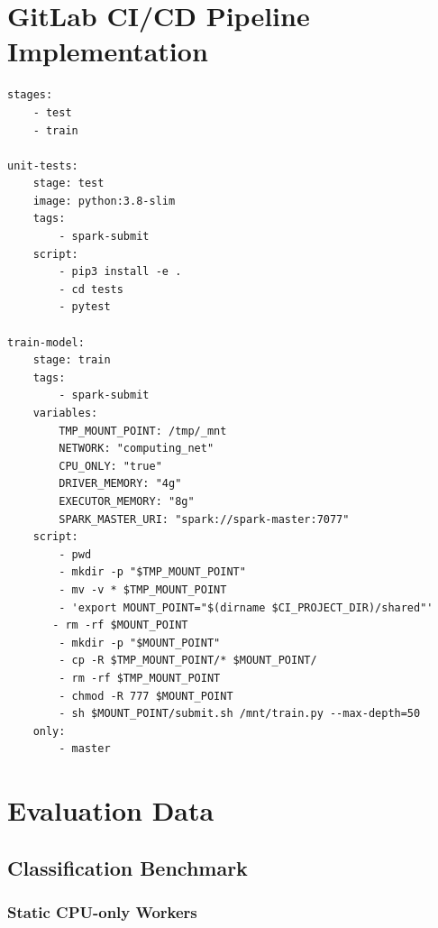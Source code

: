 \section{GitLab CI/CD Pipeline Implementation}

\begin{lstlisting}[label=lst:appendix_ci-pipeline_job, caption=texttt{.gitlab-ci.yml} configuration file]
stages:
    - test
    - train
 
unit-tests:
    stage: test
    image: python:3.8-slim
    tags:
        - spark-submit
    script:
        - pip3 install -e .
        - cd tests
        - pytest
 
train-model:
    stage: train
    tags:
        - spark-submit
    variables:
        TMP_MOUNT_POINT: /tmp/_mnt
        NETWORK: "computing_net"
        CPU_ONLY: "true"
        DRIVER_MEMORY: "4g"
        EXECUTOR_MEMORY: "8g"
        SPARK_MASTER_URI: "spark://spark-master:7077"
    script:
        - pwd
        - mkdir -p "$TMP_MOUNT_POINT"
        - mv -v * $TMP_MOUNT_POINT
        - 'export MOUNT_POINT="$(dirname $CI_PROJECT_DIR)/shared"'
       - rm -rf $MOUNT_POINT
        - mkdir -p "$MOUNT_POINT"
        - cp -R $TMP_MOUNT_POINT/* $MOUNT_POINT/
        - rm -rf $TMP_MOUNT_POINT
        - chmod -R 777 $MOUNT_POINT
        - sh $MOUNT_POINT/submit.sh /mnt/train.py --max-depth=50
    only:
        - master
\end{lstlisting}


\section{Evaluation Data}
\label{sec:appendix_eval}

\subsection{Classification Benchmark}
\label{sec:appendix_eval_classification}

\subsubsection{Static CPU-only Workers}

